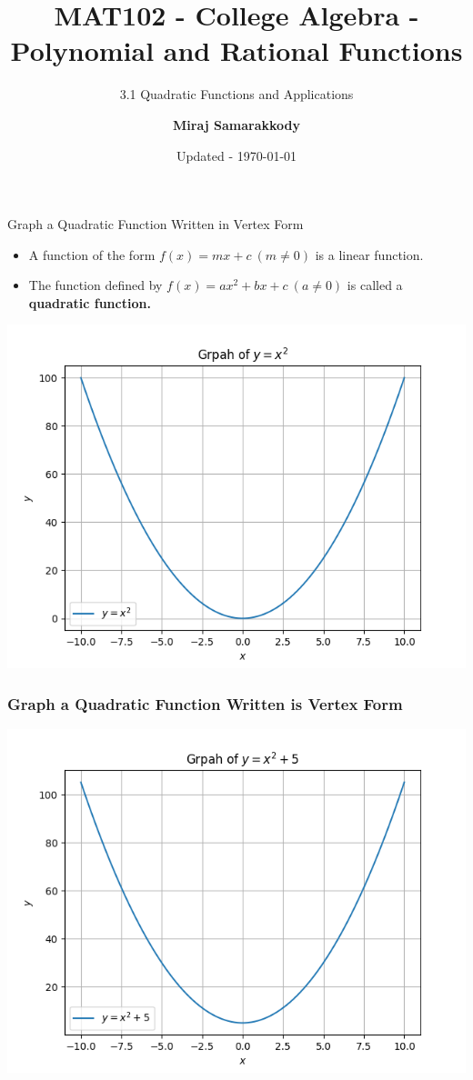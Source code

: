 \documentclass{beamer}
\title{MAT102 - College Algebra - Polynomial and Rational Functions}
\subtitle{3.1 Quadratic Functions and Applications \cite{miller2016college}}
\author{\textbf{Miraj Samarakkody}}
\institute{Tougaloo College}
\date{Updated - \today}
\begin{document}
\begin{frame}
    \titlepage
\end{frame}

\begin{frame}{Graph a Quadratic Function Written in Vertex Form}
    \begin{itemize}
        \item A function of the form \(f(x) =mx+c ~ (m \ne 0)\) is a linear function. \pause
        \item The function defined by \(f(x) = ax^2 +bx + c ~(a \ne 0) \) is called a \textbf{quadratic function.}  \pause
    \end{itemize}
    \includegraphics[scale=0.5]{figs/Figure_1.png}\pause
\end{frame}

\begin{frame}
    \frametitle{Graph a Quadratic Function Written is Vertex Form}
    \includegraphics[scale=0.5]{figs/Figure_2.png}

    

\end{frame}
\end{document}
